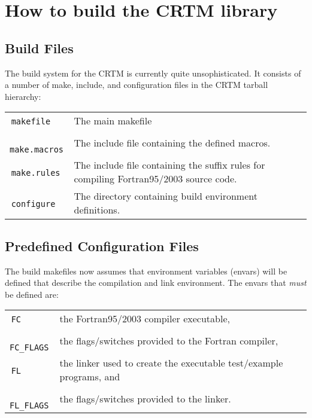 \chapter{How to build the CRTM library}
\label{sec:build}

\section{Build Files}
The build system for the CRTM is currently quite unsophisticated. It consists of a number of make, include, and configuration files in the CRTM tarball hierarchy:

\begin{tabular}{l@{ : }p{4.75in}}
  \,\texttt{makefile} & The main makefile\\
  \,\texttt{make.macros} & The include file containing the defined macros.\\
  \,\texttt{make.rules} & The include file containing the suffix rules for compiling Fortran95/2003 source code.\\
  \,\texttt{configure} & The directory containing build environment definitions.\\
\end{tabular}

\section{Predefined Configuration Files}
The build makefiles now assumes that environment variables (envars) will be defined that describe the compilation and link environment. The envars that \emph{must} be defined are:

\begin{tabular}{l@{ : }p{4.75in}}
  \,\texttt{FC}        & the Fortran95/2003 compiler executable,\\
  \,\texttt{FC\_FLAGS} & the flags/switches provided to the Fortran compiler,\\
  \,\texttt{FL}        & the linker used to create the executable test/example programs, and\\
  \,\texttt{FL\_FLAGS} & the flags/switches provided to the linker.\\
\end{tabular}
  
